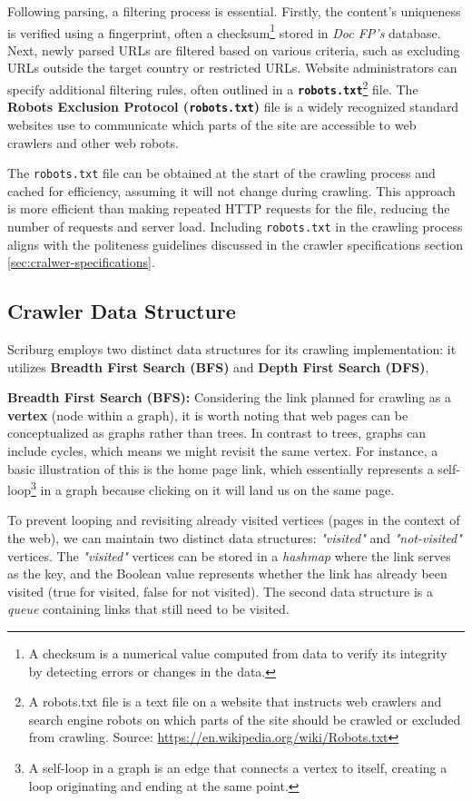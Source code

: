 Following parsing, a filtering process is essential. Firstly, the content's uniqueness is verified using a fingerprint, often a checksum\footnote{A checksum is a numerical value computed from data to verify its integrity by detecting errors or changes in the data.} stored in \textit{Doc FP's} database. Next, newly parsed URLs are filtered based on various criteria, such as excluding URLs outside the target country or restricted URLs. Website administrators can specify additional filtering rules, often outlined in a \textbf{\texttt{robots.txt}}\footnote{A robots.txt file is a text file on a website that instructs web crawlers and search engine robots on which parts of the site should be crawled or excluded from crawling. Source:  \url{https://en.wikipedia.org/wiki/Robots.txt}} file. The \textbf{Robots Exclusion Protocol (\texttt{robots.txt})} file is a widely recognized standard websites use to communicate which parts of the site are accessible to web crawlers and other web robots.

The \texttt{robots.txt} file can be obtained at the start of the crawling process and cached for efficiency, assuming it will not change during crawling. This approach is more efficient than making repeated HTTP requests for the file, reducing the number of requests and server load. Including \texttt{robots.txt} in the crawling process aligns with the politeness guidelines discussed in the crawler specifications section \ref{sec:cralwer-specifications}.

\subsection{Crawler Data Structure}
Scriburg employs two distinct data structures for its crawling implementation: it utilizes \textbf{Breadth First Search (BFS)} and \textbf{Depth First Search (DFS)}.

\textbf{Breadth First Search (BFS):} Considering the link planned for crawling as a \textbf{vertex} (node within a graph), it is worth noting that web pages can be conceptualized as graphs rather than trees. In contrast to trees, graphs can include cycles, which means we might revisit the same vertex. For instance, a basic illustration of this is the home page link, which essentially represents a self-loop\footnote{A self-loop in a graph is an edge that connects a vertex to itself, creating a loop originating and ending at the same point.} in a graph because clicking on it will land us on the same page.

To prevent looping and revisiting already visited vertices (pages in the context of the web), we can maintain two distinct data structures: \textit{"visited"} and \textit{"not-visited"} vertices. The \textit{"visited"} vertices can be stored in a \textit{hashmap} where the link serves as the key, and the Boolean value represents whether the link has already been visited (true for visited, false for not visited). The second data structure is a \textit{queue} containing links that still need to be visited.

